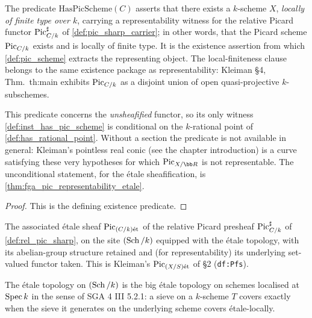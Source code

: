 \begin{definition}\leanok
  \label{def:has_pic_scheme}
  The predicate \(\mathrm{HasPicScheme}(C)\) asserts that there exists a \(k\)-scheme
  \(X\), \emph{locally of finite type over \(k\)}, carrying a
  representability witness for the relative Picard functor
  \(\operatorname{Pic}^\sharp_{C/k}\) of \cref{def:pic_sharp_carrier}; in other words,
  that the Picard scheme \(\operatorname{Pic}_{C/k}\) exists and is locally of finite
  type. It is the existence assertion from which \cref{def:pic_scheme}
  extracts the representing object. The local-finiteness clause belongs to
  the same existence package as representability: Kleiman \S 4,
  Thm.~th:main exhibits \(\operatorname{Pic}_{C/k}\) as a disjoint union of open
  quasi-projective \(k\)-subschemes.

  This predicate concerns the \emph{unsheafified} functor, so its only witness
  \cref{def:inst_has_pic_scheme} is conditional on the \(k\)-rational point of
  \cref{def:has_rational_point}. Without a section the predicate is not available
  in general: Kleiman's pointless real conic (see the chapter introduction) is a
  curve satisfying these very hypotheses for which \(\Pic_{X/\bb R}\) is not
  representable. The unconditional statement, for the \'etale sheafification, is
  \cref{thm:fga_pic_representability_etale}.
\end{definition}

\begin{proof}
  This is the defining existence predicate.
\end{proof}

\begin{definition}\leanok
  \label{def:pic_et_sheaf}
  The associated \'etale sheaf \(\operatorname{Pic}_{(C/k)\mathrm{\acute{e}t}}\) of the relative Picard
  presheaf \(\operatorname{Pic}^\sharp_{C/k}\) of \cref{def:rel_pic_sharp}, on the site
  \((\operatorname{Sch}/k)\) equipped with the \'etale topology, with its abelian-group
  structure retained and (for representability) its underlying set-valued
  functor taken. This is Kleiman's \(\operatorname{Pic}_{(X/S)\mathrm{\acute{e}t}}\) of \S 2 (\texttt{df:Pfs}).

  The \'etale topology on \((\operatorname{Sch}/k)\) is the big \'etale topology on schemes
  localised at \(\operatorname{Spec} k\) in the sense of SGA 4 III 5.2.1: a sieve on a
  \(k\)-scheme \(T\) covers exactly when the sieve it generates on the
  underlying scheme covers \'etale-locally.
\end{definition}

